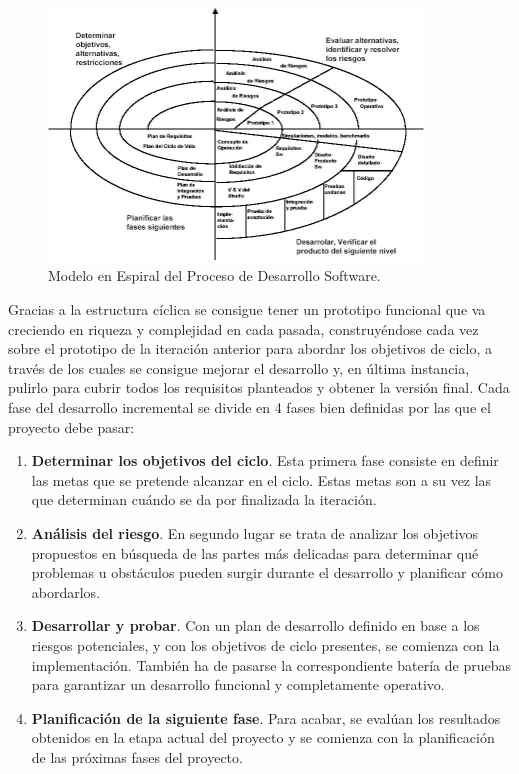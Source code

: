 \begin{figure}[!htbp]  \centering\noindent
    \includegraphics[width=0.89\textwidth]{figures/espiral_boehm.jpg}
    \caption{Modelo en Espiral del Proceso de Desarrollo Software.}
    \label{espiral_bb}
\end{figure}

Gracias a la estructura cíclica se consigue tener un prototipo funcional que va creciendo en riqueza y complejidad en cada pasada, construyéndose cada vez sobre el prototipo de la iteración anterior para abordar los objetivos de ciclo, a través de los cuales se consigue mejorar el desarrollo y, en última instancia, pulirlo para cubrir todos los requisitos planteados y obtener la versión final. Cada fase del desarrollo incremental se divide en 4 fases bien definidas por las que el proyecto debe pasar:
\begin{enumerate}
    \item \textbf{Determinar los objetivos del ciclo}. Esta primera fase consiste en definir las metas que se pretende alcanzar en el ciclo. Estas metas son a su vez las que determinan cuándo se da por finalizada la iteración.
    \item \textbf{Análisis del riesgo}. En segundo lugar se trata de analizar los objetivos propuestos en búsqueda de las partes más delicadas para determinar qué problemas u obstáculos pueden surgir durante el desarrollo y planificar cómo abordarlos.
    \item \textbf{Desarrollar y probar}. Con un plan de desarrollo definido en base a los riesgos potenciales, y con los objetivos de ciclo presentes, se comienza con la implementación. También ha de pasarse la correspondiente batería de pruebas para garantizar un desarrollo funcional y completamente operativo.
    \item \textbf{Planificación de la siguiente fase}. Para acabar, se evalúan los resultados obtenidos en la etapa actual del proyecto y se comienza con la planificación de las próximas fases del proyecto.
\end{enumerate}
